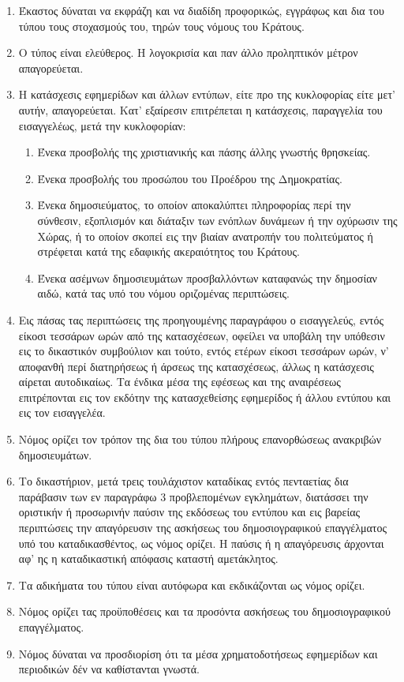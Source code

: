 \documentclass[twoside, a4paper, 10pt]{article}
\begin{document}
\begin{multicols}{2}
\begin{enumerate}
\begin{BigQuote}
\begin{enumerate}
  \item[1.] Έκαστος δύναται να εκφράζη και να διαδίδη προφορικώς, εγγράφως και δια του τύπου τους στοχασμούς του, τηρών τους νόμους του Κράτους.
  \item[2.] Ο τύπος είναι ελεύθερος. Η λογοκρισία και παν άλλο προληπτικόν μέτρον απαγορεύεται.
  \item[3.] Η κατάσχεσις εφημερίδων και άλλων εντύπων, είτε προ της κυκλοφορίας  είτε μετ' αυτήν, απαγορεύεται. Κατ' εξαίρεσιν επιτρέπεται η κατάσχεσις, παραγγελία του εισαγγελέως, μετά την κυκλοφορίαν:
	\begin{enumerate}
		\item[α)] Ένεκα προσβολής της χριστιανικής και πάσης άλλης γνωστής θρησκείας.
		\item[β)] Ένεκα προσβολής του προσώπου του Προέδρου της Δημοκρατίας.
		\item[γ)] Ένεκα δημοσιεύματος, το οποίον αποκαλύπτει πληροφορίας περί την σύνθεσιν, εξοπλισμόν και διάταξιν των ενόπλων δυνάμεων ή την οχύρωσιν της Χώρας, ή το οποίον σκοπεί εις την βιαίαν ανατροπήν του πολιτεύματος ή στρέφεται κατά της εδαφικής ακεραιότητος του Κράτους.
		\item[δ)] Ένεκα ασέμνων δημοσιευμάτων προσβαλλόντων καταφανώς την δημοσίαν αιδώ, κατά τας υπό του νόμου οριζομένας περιπτώσεις.
	\end{enumerate}
  
  \item[4.] Εις πάσας τας περιπτώσεις της προηγουμένης παραγράφου ο εισαγγελεύς, εντός είκοσι τεσσάρων ωρών από της κατασχέσεων, οφείλει να υποβάλη την υπόθεσιν εις το δικαστικόν συμβούλιον και τούτο, εντός ετέρων είκοσι τεσσάρων ωρών, ν' αποφανθή περί διατηρήσεως ή άρσεως της κατασχέσεως, άλλως η κατάσχεσις αίρεται αυτοδικαίως. Τα ένδικα μέσα της εφέσεως και της αναιρέσεως επιτρέπονται εις τον εκδότην της κατασχεθείσης εφημερίδος ή άλλου εντύπου και εις τον εισαγγελέα.
  \item[5.] Νόμος ορίζει τον τρόπον της δια του τύπου πλήρους επανορθώσεως ανακριβών δημοσιευμάτων.
  \item[6.] Το δικαστήριον, μετά τρεις τουλάχιστον καταδίκας εντός πενταετίας δια παράβασιν των εν παραγράφω 3 προβλεπομένων εγκλημάτων, διατάσσει την οριστικήν ή προσωρινήν παύσιν της εκδόσεως του εντύπου και εις βαρείας περιπτώσεις την απαγόρευσιν της ασκήσεως του δημοσιογραφικού επαγγέλματος υπό του καταδικασθέντος, ως νόμος ορίζει. Η παύσις ή η απαγόρευσις άρχονται αφ' ης η καταδικαστική απόφασις καταστή αμετάκλητος.
  \item[7.] Τα  αδικήματα του τύπου είναι αυτόφωρα και εκδικάζονται ως νόμος ορίζει.
  \item[8.] Νόμος ορίζει τας προϋποθέσεις και τα προσόντα ασκήσεως του δημοσιογραφικού επαγγέλματος.
  \item[7.] Νόμος δύναται να προσδιορίση ότι τα μέσα χρηματοδοτήσεως εφημερίδων και περιοδικών δέν να καθίστανται γνωστά.
\end{enumerate}


\end{BigQuote}
\end{enumerate}
\end{multicols}
\end{document}
